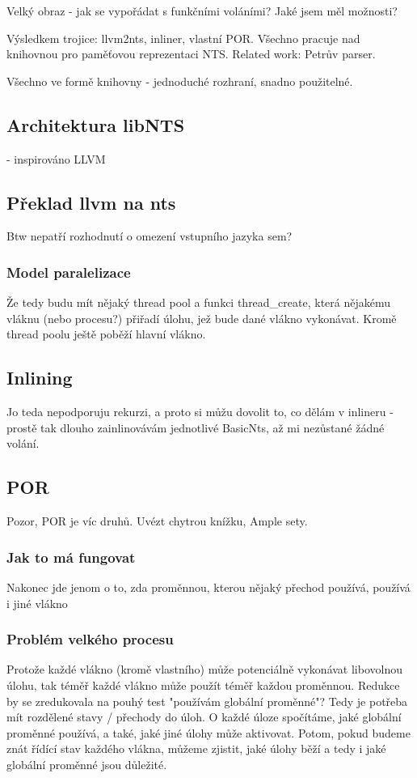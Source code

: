 \documentclass[10pt,a4paper,notitlepage]{article}
\begin{document}
Velký obraz - jak se vypořádat s funkčními voláními? Jaké jsem měl možnosti?

Výsledkem trojice: llvm2nts, inliner, vlastní POR. Všechno pracuje nad knihovnou pro paměťovou
reprezentaci NTS. Related work: Petrův parser.

Všechno ve formě knihovny - jednoduché rozhraní, snadno použitelné.

\subsection{Architektura libNTS}
- inspirováno LLVM


\subsection{Překlad llvm na nts}
Btw nepatří rozhodnutí o omezení vstupního jazyka sem?
\subsubsection{Model paralelizace}
Že tedy budu mít nějaký thread pool a funkci thread\_create, která nějakému vláknu (nebo procesu?) přiřadí úlohu, jež bude dané vlákno vykonávat. Kromě thread poolu ještě poběží hlavní vlákno.

\subsection{Inlining}
Jo teda nepodporuju rekurzi, a proto si můžu dovolit to, co dělám v inlineru - prostě tak dlouho zainlinovávám jednotlivé BasicNts, až mi nezůstané žádné volání.

\subsection{POR}
Pozor, POR je víc druhů. Uvézt chytrou knížku, Ample sety.
\subsubsection{Jak to má fungovat}
Nakonec jde jenom o to, zda proměnnou, kterou nějaký přechod používá, používá i jiné vlákno
\subsubsection{Problém velkého procesu}
Protože každé vlákno (kromě vlastního) může potenciálně vykonávat libovolnou úlohu, tak téměř každé vlákno může použít téměř každou proměnnou. Redukce by se zredukovala na pouhý test "používám globální proměnné"?
Tedy je potřeba mít rozdělené stavy / přechody do úloh. O každé úloze spočítáme, jaké globální proměnné používá, a také, jaké jiné úlohy může aktivovat. Potom, pokud budeme znát řídící stav každého vlákna, můžeme zjistit, jaké úlohy běží a tedy i jaké globální proměnné jsou důležité.
\end{document}
